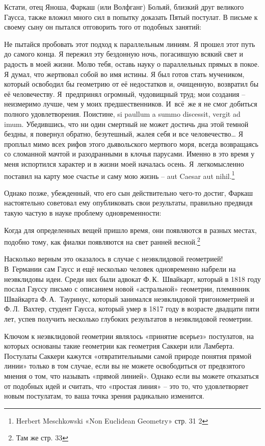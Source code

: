 \documentclass[../main.tex]{subfiles}
\begin{document}
Кстати, отец Яноша, Фаркаш (или Волфганг) Больяй, близкий друг великого Гаусса, также вложил много сил в попытку доказать Пятый постулат. В письме к своему сыну он пытался отговорить того от подобных занятий:
%
\begin{block}
Не пытайся пробовать этот подход к параллельным линиям. Я прошел этот путь до самого конца. Я пережил эту бездонную ночь, погасившую всякий свет и радость в моей жизни. Молю тебя, оставь науку о параллельных прямых в покое. Я думал, что жертвовал собой во имя истины. Я был готов стать мучеником, который освободил бы геометрию от её недостатков и, очищенную, возвратил бы её человечеству. Я~предпринял огромный, чудовищный труд; мои создания \--- неизмеримо лучше, чем у моих предшественников. И~всё~же я не смог добиться полного удовлетворения. Поистине, si paullum a summo discessit, vergit ad imum. Убедившись, что ни один смертный не может достичь дна этой темной бездны, я повернул обратно, безутешный, жалея себя и все человечество\ldots{} Я проплыл мимо всех рифов этого дьявольского мертвого моря, всегда возвращаясь со сломанной мачтой и разодранными в клочья парусами. Именно в это время у меня испортился характер и в жизни моей началась осень. Я~легкомысленно поставил на карту мое счастье и саму мою жизнь \--- aut Caesar aut nihil.\footnote{Herbert Meschkowski «Non Euclidean Geometry» стр. 31 2}
\end{block}

Однако позже, убежденный, что его сын действительно чего-то достиг, Фаркаш настоятельно советовал ему опубликовать свои результаты, правильно предвидя такую частую в науке проблему одновременности:
%
\begin{block}
Когда для определенных вещей пришло время, они появляются в разных местах, подобно тому, как фиалки появляются на свет ранней весной.\footnote{Там же стр. 33}
\end{block}

Насколько верным это оказалось в случае с неэвклидовой геометрией! В~Германии сам Гаусс и ещё несколько человек одновременно набрели на неэвклидовы идеи. Среди них были адвокат Ф.\,К.~Швайкарт, который в 1818 году послал Гауссу письмо с описанием новой «астральной» геометрии, племянник Швайкарта Ф.\,А.~Тауринус, который занимался неэвклидовой тригонометрией и Ф.\,Л.~Вахтер, студент Гаусса, который умер в 1817 году в возрасте двадцати пяти лет, успев получить несколько глубоких результатов в неэвклидовой геометрии.

Ключом к неэвклидовой геометрии являлось «принятие всерьез» постулатов, на которых основаны такие геометрии как геометрия Саккери или Ламберта. Постулаты Саккери кажутся «отвратительными самой природе понятия прямой линии» только в том случае, если вы не можете освободиться от предвзятого мнения о том, что называть «прямой линией». Однако если вы можете отказаться от подобных идей и считать, что «простая линия» \--- это то, что удовлетворяет новым постулатам, то ваша точка зрения радикально изменится.
\end{document}
